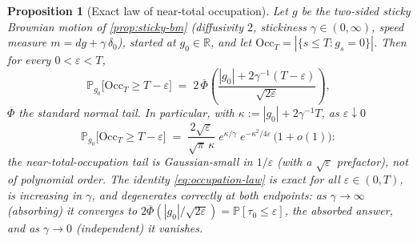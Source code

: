 \documentclass[reqno,final,11pt]{amsart}
\theoremstyle{plain}
\newtheorem{proposition}[theorem]{Proposition}
\theoremstyle{definition}
\theoremstyle{remark}
\newcommand{\R}{\mathbb R}
\newcommand{\Prob}{\mathbb P}
\begin{document}
\begin{proposition}[Exact law of near-total occupation]\label{prop:occupation}
Let $g$ be the two-sided sticky Brownian motion of \cref{prop:sticky-bm}
(diffusivity $2$, stickiness $\gamma\in(0,\infty)$, speed measure
$m=dg+\gamma\,\delta_0$), started at $g_0\in\R$, and let
$\mathrm{Occ}_T=|\{s\le T:g_s=0\}|$. Then for every $0<\varepsilon<T$,
\begin{equation}\label{eq:occupation-law}
  \Prob_{g_0}\bigl[\mathrm{Occ}_T\ge T-\varepsilon\bigr]
  \;=\;2\,\overline\Phi\!\left(\frac{|g_0|+2\gamma^{-1}(T-\varepsilon)}
  {\sqrt{2\varepsilon}}\right),
\end{equation}
$\overline\Phi$ the standard normal tail. In particular, with
$\kappa:=|g_0|+2\gamma^{-1}T$, as $\varepsilon\downarrow0$
\begin{equation}\label{eq:occupation-asymp}
  \Prob_{g_0}\bigl[\mathrm{Occ}_T\ge T-\varepsilon\bigr]
  \;=\;\frac{2\sqrt\varepsilon}{\sqrt{\pi}\,\kappa}\;
  e^{\kappa/\gamma}\;e^{-\kappa^{2}/4\varepsilon}\,\bigl(1+o(1)\bigr):
\end{equation}
the near-total-occupation tail is Gaussian-small in $1/\varepsilon$ (with a
$\sqrt\varepsilon$ prefactor), not of polynomial order. The identity
\eqref{eq:occupation-law} is exact for all $\varepsilon\in(0,T)$, is increasing
in $\gamma$, and degenerates correctly at both endpoints: as
$\gamma\to\infty$ (absorbing) it converges to
$2\overline\Phi(|g_0|/\sqrt{2\varepsilon})=\Prob[\tau_0\le\varepsilon]$, the
absorbed answer, and as $\gamma\to0$ (independent) it vanishes.
\end{proposition}
\end{document}
